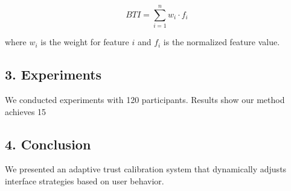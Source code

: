 \begin{equation}BTI = \sum_{i=1}^{n} w_i \cdot f_i\end{equation}

where $w_i$ is the weight for feature $i$ and $f_i$ is the normalized feature value.

\subsection{3. Experiments}

We conducted experiments with 120 participants. Results show our method achieves 15%

\subsection{4. Conclusion}

We presented an adaptive trust calibration system that dynamically adjusts interface strategies based on user behavior.
